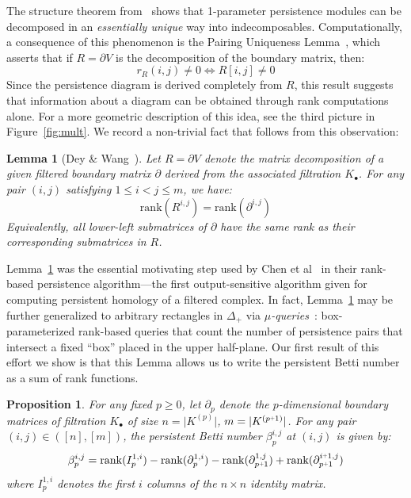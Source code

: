 \documentclass[10pt]{article}
\newcommand{\+}{%
	\raisebox{0.18ex}{\scaleobj{0.55}{+}}
}
\newtheorem{proposition}{Proposition}
\newtheorem{lemma}{Lemma}
\begin{document}
The structure theorem from~\cite{zomorodian2004computing} shows that 1-parameter persistence modules can be decomposed in an \emph{essentially unique} way into indecomposables. Computationally, a consequence of this phenomenon is the Pairing Uniqueness Lemma~\cite{cohen2006vines}, which asserts that if $R = \partial V$ is the decomposition of the boundary matrix, then:  
$$ r_R(i,j) \neq 0 \Leftrightarrow R[i,j] \neq 0 $$
Since the persistence diagram is derived completely from $R$, this result suggests that information about a diagram can be obtained through rank computations alone.
For a more geometric description of this idea, see the third picture in Figure~\ref{fig:mult}. We record a non-trivial fact that follows from this observation: 
\begin{lemma}[Dey \& Wang~\cite{dey2022computational}]\label{lemma:rank}
Let $R = \partial V$ denote the matrix decomposition of a given filtered boundary matrix $\partial$ derived from the associated filtration $K_\bullet$. For any pair $(i,j)$ satisfying $1 \leq i < j \leq m$, we have:
	\begin{equation}\label{eq:lower_left_rank}
		\mathrm{rank}(R^{i,j}) = \mathrm{rank}(\partial^{i, j})
	\end{equation}
Equivalently, all lower-left submatrices of $\partial$ have the same rank as their corresponding submatrices in $R$. 
\end{lemma}
\noindent Lemma~\ref{lemma:rank} was the essential motivating step used by Chen et al~\cite{chen2011output} in their rank-based persistence algorithm---the first output-sensitive algorithm given for computing persistent homology of a filtered complex. 
In fact, Lemma~\ref{lemma:rank} may be further generalized to arbitrary rectangles in $\Delta_+$ via $\mu$\emph{-queries}~\cite{chen2011output}: box-parameterized rank-based queries that count the number of persistence pairs that intersect a fixed ``box'' placed in the upper half-plane. 
Our first result of this effort we show is that this Lemma allows us to write the persistent Betti number as a sum of rank functions. 
\begin{proposition}
For any fixed $p \geq 0$, let $\partial_p$ denote the $p$-dimensional boundary matrices of filtration $K_\bullet$ of size $n = \lvert K^{(p)} \rvert$, $m = \lvert K^{(p\+1)} \rvert$. For any pair $(i,j) \in \left([n], [m] \right)$, the persistent Betti number $\beta_p^{i,j}$ at $(i,j)$ is given by:
	\begin{equation}\label{eq:betti_four}
	\beta_p^{i,j} = \mathrm{rank}(I_p^{1,i}) - \mathrm{rank}(\partial_p^{1,i}) - \mathrm{rank}(\partial_{p\+1 }^{1,j}) + \mathrm{rank}(\partial_{p\+1}^{i \+ 1, j} )
	\end{equation}
where $I_p^{1,i}$ denotes the first $i$ columns of the $n \times n$ identity matrix.
\end{proposition}
\end{document}
